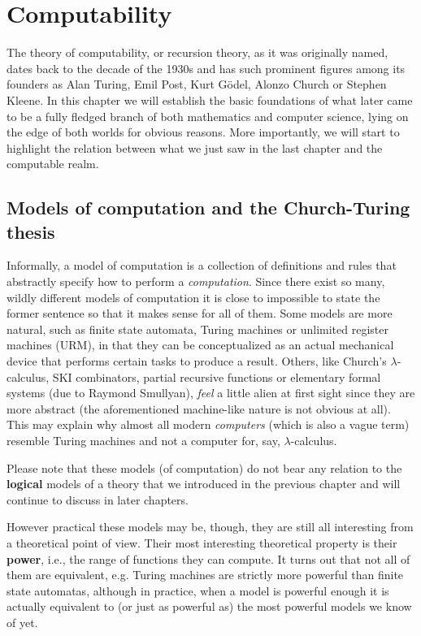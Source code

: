 \documentclass[../main.tex]{memoir}
\begin{document}
\chapter{Computability}

The theory of computability, or recursion theory, as it was originally named, dates back to the decade of the 1930s and has such prominent figures among its founders as Alan Turing, Emil Post, Kurt Gödel, Alonzo Church or Stephen Kleene. In this chapter we will establish the basic foundations of what later came to be a fully fledged branch of both mathematics and computer science, lying on the edge of both worlds for obvious reasons. More importantly, we will start to highlight the relation between what we just saw in the last chapter and the computable realm. \\

\section{Models of computation and the Church-Turing thesis}

Informally, a model of computation is a collection of definitions and rules that abstractly specify how to perform a \textit{computation}. Since there exist so many, wildly different models of computation it is close to impossible to state the former sentence so that it makes sense for all of them. Some models are more natural, such as finite state automata, Turing machines or unlimited register machines (URM), in that they can be conceptualized as an actual mechanical device that performs certain tasks to produce a result. Others, like Church's $\lambda$-calculus, SKI combinators, partial recursive functions or elementary formal systems (due to Raymond Smullyan), \textit{feel} a little alien at first sight since they are more abstract (the aforementioned machine-like nature is not obvious at all). This may explain why almost all modern \textit{computers} (which is also a vague term) resemble Turing machines and not a computer for, say, $\lambda$-calculus. \\

\begin{remark}
  Please note that these models (of computation) do not bear any relation to the \textbf{logical} models of a theory that we introduced in the previous chapter and will continue to discuss in later chapters.
\end{remark}

However practical these models may be, though, they are still all interesting from a theoretical point of view. Their most interesting theoretical property is their \textbf{power}, i.e., the range of functions they can compute. It turns out that not all of them are equivalent, e.g. Turing machines are strictly more powerful than finite state automatas, although in practice, when a model is powerful enough it is actually equivalent to (or just as powerful as) the most powerful models we know of yet. \\
\end{document}
